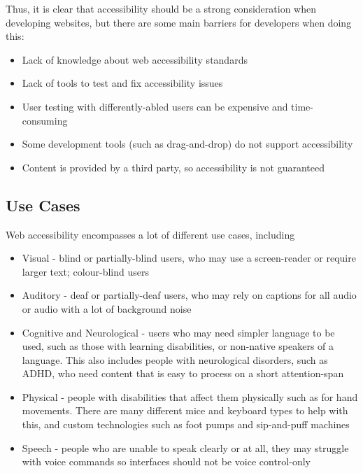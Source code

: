 \documentclass[ %
                    author={Aleena Baig},
                supervisor={Dr Simon Lock},
                    degree={BSc},
                     title={On Making Web Accessible Graphs},
                  subtitle={},
                      year={2019} ]{dissertation}
\begin{document}
Thus, it is clear that accessibility should be a strong consideration when developing websites, but there are some main barriers for developers when doing this:

\begin{itemize}
    \item Lack of knowledge about web accessibility standards
    \item Lack of tools to test and fix accessibility issues
    \item User testing with differently-abled users can be expensive and time-consuming
    \item Some development tools (such as drag-and-drop) do not support accessibility
    \item Content is provided by a third party, so accessibility is not guaranteed
\end{itemize}

\subsection{Use Cases}

Web accessibility encompasses a lot of different use cases, including

\begin{itemize}
    \item Visual - blind or partially-blind users, who may use a screen-reader or require larger text; colour-blind users
    \item Auditory - deaf or partially-deaf users, who may rely on captions for all audio or audio with a lot of background noise
    \item Cognitive and Neurological - users who may need simpler language to be used, such as those with learning disabilities, or non-native speakers of a language. This also includes people with neurological disorders, such as ADHD, who need content that is easy to process on a short attention-span
    \item Physical - people with disabilities that affect them physically such as for hand movements. There are many different mice and keyboard types to help with this, and custom technologies such as foot pumps and sip-and-puff machines
    \item Speech - people who are unable to speak clearly or at all, they may struggle with voice commands so interfaces should not be voice control-only
\end{itemize}
\end{document}
